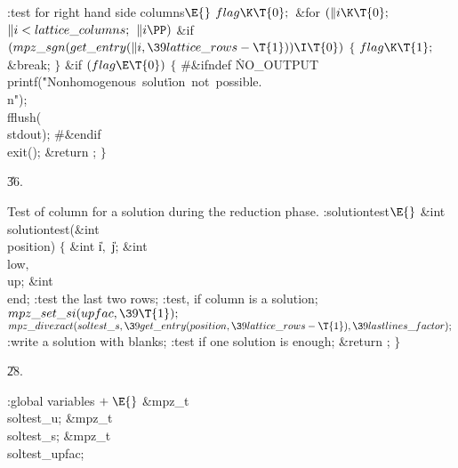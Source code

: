\Y\B\4:test for right hand side columns\X${}\E{}$\6
$\\{flag}\K\T{0};{}$\6
\&{for} ${}(\|i\K\T{0};{}$ ${}\|i<\\{lattice\_columns};{}$ ${}\|i\PP){}$\1\6
\&{if} ${}(\\{mpz\_sgn}(\\{get\_entry}(\|i,\39\\{lattice\_rows}-\T{1}))\I%
\T{0}){}$\5
${}\{{}$\1\6
${}\\{flag}\K\T{1};{}$\6
\&{break};\6
\4${}\}{}$\2\2\6
\&{if} ${}(\\{flag}\E\T{0}){}$\5
${}\{{}$\6
\8\#\&{ifndef} \.{NO\_OUTPUT}\1\6
\\{printf}(\.{"Nonhomogenous\ solut}\)\.{ion\ not\ possible.\\n"});\5
\\{fflush}(\\{stdout});\6
\8\#\&{endif}\6
\\{exit}();\6
\&{return} ;\6
\4${}\}{}$\2\par
\U36.\fi

Test of column  for a solution during the reduction
phase.
\Y\B\4:solutiontest\X${}\E{}$\6
\&{int} \\{solutiontest}(\&{int} \\{position})\1\1\2\2\6
${}\{{}$\1\6
\&{int} \|i${},{}$ \|j;\6
\&{int} \\{low}${},{}$ \\{up};\6
\&{int} \\{end};\7
:test the last two rows\X;\6
:test, if column is a solution\X;\6
${}\\{mpz\_set\_si}(\\{upfac},\39\T{1});{}$\6
${}\\{mpz\_divexact}(\\{soltest\_s},\39\\{get\_entry}(\\{position},\39%
\\{lattice\_rows}-\T{1}),\39\\{lastlines\_factor});{}$\6
:write a solution with blanks\X;\6
:test if one solution is enough\X;\6
\&{return} ;\6
\4${}\}{}$\2\par
\U28.\fi

\B{}:global variables\X${}\mathrel+\E{}$\6
\&{mpz\_t} \\{soltest\_u};\6
\&{mpz\_t} \\{soltest\_s};\6
\&{mpz\_t} \\{soltest\_upfac};\par
\fi

